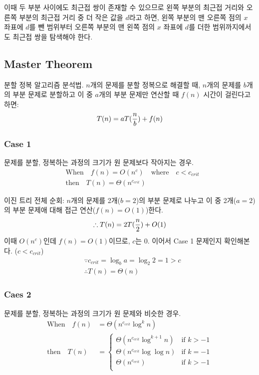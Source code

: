 이때 두 부분 사이에도 최근접 쌍이 존재할 수 있으므로 왼쪽 부분의 최근접 거리와 오른쪽 부분의 최근접 거리 중 더 작은 값을 $d$라고 하면, 왼쪽 부분의 맨 오른쪽 점의 $x$ 좌표에 $d$를 뺀 범위부터 오른쪽 부분의 맨 왼쪽 점의 $x$ 좌표에 $d$를 더한 범위까지에서도 최근접 쌍을 탐색해야 한다.

\subsection{Master Theorem}

분할 정복 알고리즘 분석법. $n$개의 문제를 분할 정복으로 해결할 때, $n$개의 문제를 $b$개의 부분 문제로 분할하고 이 중 $a$개의 부분 문제만 연산할 때 $f(n)$ 시간이 걸린다고 하면:
$$
T(n) = aT({n \over b}) + f(n)
$$

\subsubsection{Case 1}

문제를 분할, 정복하는 과정의 크기가 원 문제보다 작아지는 경우.
$$
\begin{aligned}
  &\text{When} \quad f(n) = O(n^c) \quad \text{where} \quad c < c_{crit} \\
  &\text{then} \quad T(n) = \Theta(n^{c_{crit}})
\end{aligned}
$$

이진 트리 전체 순회: $n$개의 문제를 2개($b = 2$)의 부분 문제로 나누고 이 중 2개($a = 2$)의 부분 문제애 대해 접근 연산($f(n) = O(1)$)한다.
$$
\therefore T(n) = 2T({n \over 2}) + O(1)
$$
이때 $O(n^c)$인데 $f(n) = O(1)$이므로, $c$는 0. 이어서 Case 1 문제인지 확인해본다. ($c < c_{crit}$)
$$
\begin{aligned}
  &\because c_{crit} = \log_b{a} = \log_2{2} = 1 > c \\
  &\therefore T(n) = \Theta(n)
\end{aligned}
$$

\subsubsection{Caes 2}

문제를 분할, 정복하는 과정의 크기가 원 문제와 비슷한 경우.
$$
\begin{aligned}
  \text{When} \quad f(n) &= \Theta(n^{c_{crit}} \log^k{n}) \\
  \text{then} \quad T(n) &=
  \begin{cases}
    \Theta(n^{c_{crit}} \log^{k + 1}{n}) &\text{if } k > -1 \\
    \Theta(n^{c_{crit}} \log \log{n}) &\text{if } k = -1 \\
    \Theta(n^{c_{crit}}) &\text{if } k > -1 \\
  \end{cases}
\end{aligned}
$$

